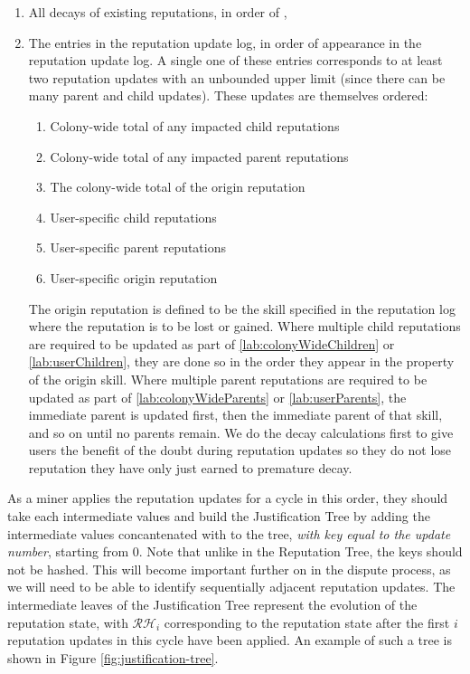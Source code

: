 \begin{enumerate}
\item All decays of existing reputations, in order of ,
\item The entries in the reputation update log, in order of appearance in the reputation update log. A single one of these entries corresponds to at least two reputation updates with an unbounded upper limit (since there can be many parent and child updates). These updates are themselves ordered:
\begin{enumerate}
  \item Colony-wide total of any impacted child reputations \label{lab:colonyWideChildren}
  \item Colony-wide total of any impacted parent reputations \label{lab:colonyWideParents}
  \item The colony-wide total of the origin reputation
  \item User-specific child reputations \label{lab:userChildren}
  \item User-specific parent reputations\label{lab:userParents}
  \item User-specific origin reputation
\end{enumerate}
The origin reputation is defined to be the skill specified in the reputation log where the reputation is to be lost or gained. Where multiple child reputations are required to be updated as part of \ref{lab:colonyWideChildren} or \ref{lab:userChildren}, they are done so in the order they appear in the  property of the origin skill. Where multiple parent reputations are required to be updated as part of \ref{lab:colonyWideParents} or \ref{lab:userParents}, the immediate parent is updated first, then the immediate parent of that skill, and so on until no parents remain. We do the decay calculations first to give users the benefit of the doubt during reputation updates so they do not lose reputation they have only just earned to premature decay.
\end{enumerate}

As a miner applies the reputation updates for a cycle in this order, they should take each intermediate  values and build the Justification Tree by adding the intermediate  values concantenated with  to the tree, \textit{with key equal to the update number}, starting from 0. Note that unlike in the Reputation Tree, the keys should not be hashed. This will become important further on in the dispute process, as we will need to be able to identify sequentially adjacent reputation updates. The intermediate leaves of the Justification Tree represent the evolution of the reputation state, with $\mathcal{RH}_i$ corresponding to the reputation state after the first $i$ reputation updates in this cycle have been applied. An example of such a tree is shown in Figure \ref{fig:justification-tree}.

